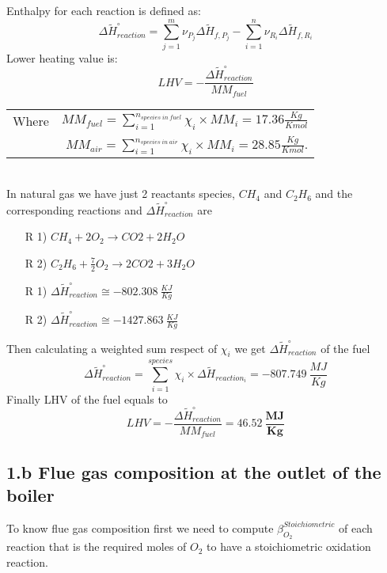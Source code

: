 \documentclass[a4paper,12pt]{article}
\begin{document}
Enthalpy for each reaction is defined as:
\begin{equation}
\Delta \widetilde{H}_{reaction} ^\circ =
\sum_{j=1}^{m} \nu_{P_j}\Delta \widetilde{H}_{f,P_j}-
\sum_{i=1}^{n} \nu_{R_i}\Delta \widetilde{H}_{f,R_i}
\end{equation}
Lower heating value is:
\begin{equation}
LHV = -
\frac{\Delta \widetilde{H}_{reaction} ^\circ}
{MM_{fuel}} 
\end{equation}
{\renewcommand{\arraystretch}{1.2}
\begin{tabular}{l r}
Where & $ {MM_{fuel}} = \sum_{i=1}^{n_{species\ in\ fuel}}\chi_i \times MM_i = 17.36 \frac{Kg}{Kmol}$  \\[2ex]
      & ${MM_{air}} = \sum_{i=1}^{n_{species\ in\ air}}\chi_i \times MM_i = 28.85 \frac{Kg}{Kmol}$.
\end{tabular}
\\

In natural gas we have just 2 reactants species, $CH_4$ and $C_2H_6$ and the corresponding reactions and $ \Delta \widetilde{H}_{reaction} ^\circ $ are

\begin{enumerate}
\item[R 1)] $CH_4+2O_2 \rightarrow CO2+2H_2O$
\item[R 2)] $C_2H_6+\frac{7}{2} O_2 \rightarrow 2CO2+3H_2O$
\end{enumerate}

\begin{enumerate}
\item[R 1)] $ \Delta \widetilde{H}_{reaction} ^\circ \cong 
-802.308\ \frac{KJ}{Kg}$
\item[R 2)] $ \Delta \widetilde{H}_{reaction} ^\circ \cong 
-1427.863\ \frac{KJ}{Kg}$
\end{enumerate}
Then calculating a weighted sum respect of $\chi_i$ we get $ \Delta \widetilde{H}_{reaction} ^\circ $ of the fuel
\begin{equation}
\Delta \widetilde{H}_{reaction} ^\circ =
\sum_{i=1}^{species} \chi_i \times \Delta \widetilde{H}_{reaction_i} = -807.749\ \frac{MJ}{Kg}
\end{equation}
Finally LHV of the fuel equals to
\begin{equation}
LHV = -\frac{\Delta \widetilde{H}_{reaction} ^\circ}{MM_{fuel}} = 
\boldsymbol{46.52\ \frac{MJ}{Kg}}
\end{equation}

\subsection*{1.b Flue gas composition at the outlet of the boiler} 
To know flue gas composition first we need to compute $\beta_{O_2}^{Stoichiometric}$ of each reaction that is the required moles of $O_2$ to have a stoichiometric oxidation reaction.

}
\end{document}
